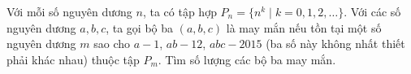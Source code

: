 \ifshowproblem
\begin{problem}\label{example:CHN-2015-SEMO-10-P4}
    Với mỗi số nguyên dương $n$, ta có tập hợp $P_n = \{ n^k \mid k = 0,1,2, \ldots \}$.
    Với các số nguyên dương $a, b, c$, ta gọi bộ ba $(a, b, c)$ là may mắn nếu tồn tại một số nguyên dương $m$
    sao cho $a - 1$, $ab - 12$, $abc - 2015$ (ba số này không nhất thiết phải khác nhau) thuộc tập $P_m$. Tìm số lượng các bộ ba may mắn.
\end{problem}
\fi

\footnotemark
{}
\fi